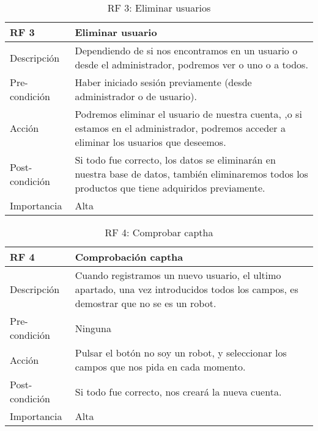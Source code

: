 \begin{table}[htbp]
\begin{center}
\begin{tabular}{|l|p{10cm}|}
\hline
\textbf{RF 3} & \textbf{Eliminar usuario}                                                                                                                       \\ \hline
Descripción   & Dependiendo de si nos encontramos en un usuario o desde el administrador, podremos ver o uno o a todos.                                         \\ \hline
Pre-condición   & Haber iniciado sesión previamente (desde administrador o de usuario).                                                                           \\ \hline
Acción        & Podremos eliminar el usuario de nuestra cuenta, ,o si estamos en el administrador, podremos acceder a eliminar los usuarios que deseemos.         \\ \hline
Post-condición & Si todo fue correcto, los datos se eliminarán en nuestra base de datos, también eliminaremos todos los productos que tiene adquiridos previamente. \\ \hline
Importancia   & Alta                                                                                                                                            \\ \hline
\end{tabular}
\caption{RF 3: Eliminar usuarios}
	\label{tabla:tablaB3}
	\end{center}
\end{table}

\begin{table}[htbp]
\begin{center}
\begin{tabular}{|l|p{10cm}|}
\hline
\textbf{RF 4} & \textbf{Comprobación captha}                                                                                                 \\ \hline
Descripción   & Cuando registramos un nuevo usuario, el ultimo apartado, una vez introducidos todos los campos, es demostrar que no se es un robot. \\ \hline
Pre-condición   & Ninguna                                                                                                                      \\ \hline
Acción        & Pulsar el botón no soy un robot, y seleccionar los campos que nos pida en cada momento.                                      \\ \hline
Post-condición & Si todo fue correcto, nos creará la nueva cuenta. \\ \hline
Importancia   & Alta                                                                                                                         \\ \hline
\end{tabular}
\caption{RF 4: Comprobar captha}
	\label{tabla:tablaB4}
	\end{center}
\end{table}

